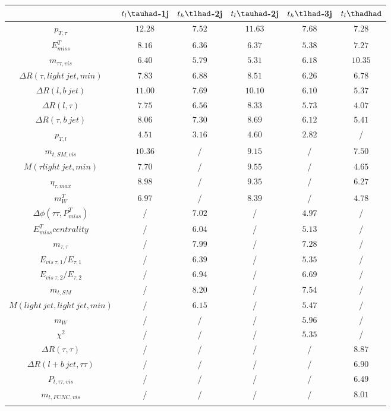 \centering
\begin{tabular}{cccccc} \toprule\toprule
 & $t_{l}\tauhad$-1j & $t_{h}\tlhad$-2j & $t_{l}\tauhad$-2j & $t_{h}\tlhad$-3j & $t_l\thadhad$\\\midrule
$p_{T,\tau }$ & $12.28$ & $7.52$ & $11.63$ & $7.68$ & $7.28$\\
$E^{T}_{miss}$ & $8.16$ & $6.36$ & $6.37$ & $5.38$ & $7.27$\\
$m_{\tau \tau ,vis}$ & $6.40$ & $5.79$ & $5.31$ & $6.18$ & $10.35$\\
$\Delta R(\tau ,light~jet,min)$ & $7.83$ & $6.88$ & $8.51$ & $6.26$ & $6.78$\\
$\Delta R(l,b~jet)$ & $11.00$ & $7.69$ & $10.10$ & $6.10$ & $5.37$\\
$\Delta R(l,\tau )$ & $7.75$ & $6.56$ & $8.33$ & $5.73$ & $4.07$\\
$\Delta R(\tau ,b~jet)$ & $8.06$ & $7.30$ & $8.69$ & $6.12$ & $5.41$\\
$p_{T,l}$ & $4.51$ & $3.16$ & $4.60$ & $2.82$ &  /\\
$m_{t,SM,vis}$ & $10.36$ &  / & $9.15$ &  / & $7.50$\\
$M(\tau  light~jet,min)$ & $7.70$ &  / & $9.55$ &  / & $4.65$\\
$\eta_{\tau ,max}$ & $8.98$ &  / & $9.35$ &  / & $6.27$\\
$m^{T}_{W}$ & $6.97$ &  / & $8.39$ &  / & $4.78$\\
$\Delta\phi(\tau \tau ,P^{T}_{miss})$ &  / & $7.02$ &  / & $4.97$ &  /\\
$E^{T}_{miss} centrality$ &  / & $6.04$ &  / & $5.13$ &  /\\
$m_{\tau ,\tau }$ &  / & $7.99$ &  / & $7.28$ &  /\\
$E_{vis~\tau ,1}/E_{\tau ,1}$ &  / & $6.39$ &  / & $5.35$ &  /\\
$E_{vis~\tau ,2}/E_{\tau ,2}$ &  / & $6.94$ &  / & $6.69$ &  /\\
$m_{t,SM}$ &  / & $8.20$ &  / & $7.54$ &  /\\
$M(light~jet,light~jet,min)$ &  / & $6.15$ &  / & $5.47$ &  /\\
$m_{W}$ &  / &  / &  / & $5.96$ &  /\\
$\chi^{2}$ &  / &  / &  / & $5.35$ &  /\\
$\Delta R(\tau ,\tau )$ &  / &  / &  / &  / & $8.87$\\
$\Delta R(l+b~jet,\tau \tau )$ &  / &  / &  / &  / & $6.90$\\
$P_{t,\tau \tau ,vis}$ &  / &  / &  / &  / & $6.49$\\
$m_{t,FCNC,vis}$ &  / &  / &  / &  / & $8.01$\\
\bottomrule\bottomrule\\
\end{tabular}
